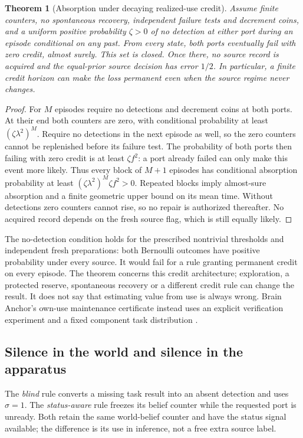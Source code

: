 \documentclass[11pt,a4paper]{article}
\newtheorem{theorem}[proposition]{Theorem}
\begin{document}
\begin{theorem}[Absorption under decaying realized-use credit]
\label{thm:credit-death}
Assume finite counters, no spontaneous recovery, independent failure
tests and decrement coins, and a uniform positive probability
$\zeta>0$ of no detection at either port during an episode conditional
on any past. From every state, both ports eventually fail with zero
credit, almost surely. This set is closed. Once there, no source
record is acquired and the equal-prior source decision has error
$1/2$. In particular, a finite credit horizon can make the loss
permanent even when the source regime never changes.
\end{theorem}
\begin{proof}
For $M$ episodes require no detections and decrement coins at both
ports. At their end both counters are zero, with conditional
probability at least $(\zeta\lambda^2)^M$. Require no detections in the next episode as well, so the
zero counters cannot be replenished before its failure test.
The probability of both ports then failing with zero credit is
at least $\zeta f^2$: a port already failed can only make this event
more likely. Thus every block of $M+1$ episodes has conditional
absorption probability at least
$(\zeta\lambda^2)^M\zeta f^2>0$. Repeated blocks imply
almost-sure absorption and a finite geometric upper bound on its
mean time. Without detections zero counters cannot rise, so no repair
is authorized thereafter. No acquired record depends on the fresh
source flag, which is still equally likely.
\end{proof}

The no-detection condition holds for the prescribed nontrivial
thresholds and independent fresh preparations: both Bernoulli
outcomes have positive probability under every source. It would fail
for a rule granting permanent credit on every episode. The theorem
concerns this credit architecture; exploration, a protected reserve,
spontaneous recovery or a different credit rule can change the result.
It does not say that estimating value from use is always wrong. Brain
Anchor's own-use maintenance certificate instead uses an explicit
verification experiment and a fixed component task distribution
\cite{BrainAnchor}.

\subsection{Silence in the world and silence in the apparatus}

The \emph{blind} rule converts a missing task result into an absent
detection and uses $\sigma=1$. The \emph{status-aware} rule freezes
its belief counter while the requested port is unready. Both retain
the same world-belief counter and have the status signal available;
the difference is its use in inference, not a free extra source
label.
\end{document}
